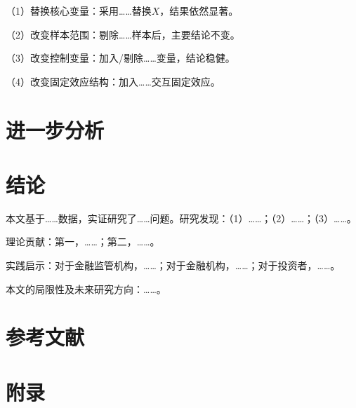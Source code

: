 \documentclass[10pt, UTF8, twocolumn]{ctexart}
\begin{document}
（1）替换核心变量：采用……替换$X$，结果依然显著。

（2）改变样本范围：剔除……样本后，主要结论不变。

（3）改变控制变量：加入/剔除……变量，结论稳健。

（4）改变固定效应结构：加入……交互固定效应。

\section{进一步分析}
\label{sec:further}

\section{结论}
\label{sec:concl}

本文基于……数据，实证研究了……问题。研究发现：（1）……；（2）……；（3）……。

理论贡献：第一，……；第二，……。

实践启示：对于金融监管机构，……；对于金融机构，……；对于投资者，……。

本文的局限性及未来研究方向：……。

\section*{参考文献}


\clearpage
\appendix
\section*{附录}
\end{document}
